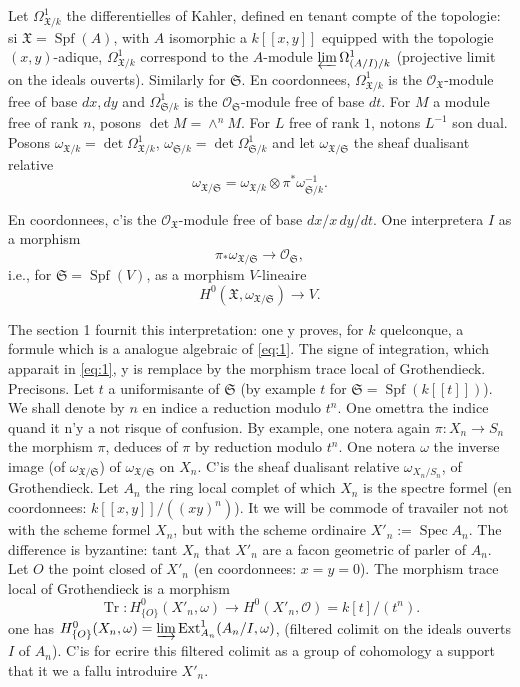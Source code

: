 \documentclass[12pt,a4paper]{article}
\theoremstyle{plain}
\theoremstyle{definition}
\theoremstyle{remark}
\DeclareMathOperator{\Spf}{Spf}
\DeclareMathOperator{\Spec}{Spec}
\DeclareMathOperator{\Ext}{Ext}
\DeclareMathOperator{\Tr}{Tr}
\newcommand{\OO}{\mathcal{O}}
\providecommand{\Ext}{\operatorname{Ext}}
\providecommand{\Spec}{\operatorname{Spec}}
\providecommand{\Tr}{\operatorname{Tr}}
\begin{document}
Let $\Omega^1_{\mathfrak{X}/k}$ the differentielles of Kahler, defined en tenant
compte of the topologie: si $\mathfrak{X}=\Spf(A)$, with $A$ isomorphic a $k[[x,y]]$
equipped with the topologie $(x,y)$-adique, $\Omega^1_{\mathfrak{X}/k}$ correspond to the $A$-module
$\varprojlim \Omega^1_{(A/I)/k}$ (projective limit on the ideals ouverts). Similarly
for $\mathfrak{S}$. En coordonnees, $\Omega^1_{\mathfrak{X}/k}$ is the
$\OO_{\mathfrak{X}}$-module free of base $dx,dy$ and $\Omega^1_{\mathfrak{S}/k}$ is the
$\OO_{\mathfrak{S}}$-module free of base $dt$. For $M$ a module free of rank $n$,
posons $\det M=\wedge^n M$. For $L$ free of rank $1$, notons $L^{-1}$ son dual.
Posons $\omega_{\mathfrak{X}/k}=\det\Omega^1_{\mathfrak{X}/k}$,
$\omega_{\mathfrak{S}/k}=\det\Omega^1_{\mathfrak{S}/k}$ and let
$\omega_{\mathfrak{X}/\mathfrak{S}}$ the sheaf dualisant relative
\[
\omega_{\mathfrak{X}/\mathfrak{S}}=\omega_{\mathfrak{X}/k}\otimes\pi^*\omega_{\mathfrak{S}/k}^{-1}.
\]

En coordonnees, c'is the $\OO_{\mathfrak{X}}$-module free of base
$dx/x\,dy/dt$. One interpretera $I$ as a morphism
\[
\pi_*\omega_{\mathfrak{X}/\mathfrak{S}}\to\OO_{\mathfrak{S}},
\]
i.e., for $\mathfrak{S}=\Spf(V)$, as a morphism $V$-lineaire
\[
H^0(\mathfrak{X},\omega_{\mathfrak{X}/\mathfrak{S}})\to V.
\]

The section 1 fournit this interpretation: one y proves, for $k$ quelconque,
a formule which is a analogue algebraic of \eqref{eq:1}. The signe of integration,
which apparait in \eqref{eq:1}, y is remplace by the morphism trace local of
Grothendieck. Precisons. Let $t$ a uniformisante of $\mathfrak{S}$ (by example $t$
for $\mathfrak{S}=\Spf(k[[t]])$). We shall denote by $n$ en indice a reduction modulo
$t^n$. One omettra the indice quand it n'y a not risque of confusion. By example, one
notera again $\pi:X_n\to S_n$ the morphism $\pi$, deduces of $\pi$ by reduction modulo
$t^n$. One notera $\omega$ the inverse image (of $\omega_{\mathfrak{X}/\mathfrak{S}}$) of
$\omega_{\mathfrak{X}/\mathfrak{S}}$ on $X_n$. C'is the sheaf dualisant relative
$\omega_{X_n/S_n}$, of Grothendieck. Let $A_n$ the ring local complet of which $X_n$ is
the spectre formel (en coordonnees: $k[[x,y]]/((xy)^n)$). It we will be commode of
travailer not not with the scheme formel $X_n$, but with the scheme ordinaire
$X'_n:=\Spec A_n$. The difference is byzantine: tant $X_n$ that $X'_n$ are a facon
geometric of parler of $A_n$. Let $O$ the point closed of $X'_n$ (en coordonnees:
$x=y=0$). The morphism trace local of Grothendieck is a morphism
\[
\Tr:H^0_{\{O\}}(X'_n,\omega)\to H^0(X'_n,\OO)=k[t]/(t^n).
\]
one has $H^0_{\{O\}}(X_n,\omega)=\varinjlim\Ext^1_{A_n}(A_n/I,\omega)$, (filtered colimit on the
ideals ouverts $I$ of $A_n$). C'is for ecrire this filtered colimit as a group of
cohomology a support that it we a fallu introduire $X'_n$.
\end{document}
